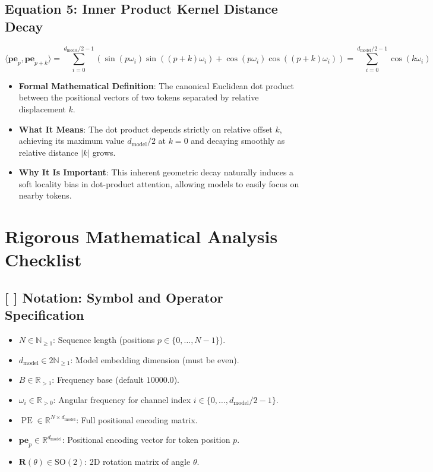 \documentclass[11pt,a4paper]{article}
\theoremstyle{definition}
\begin{document}
\subsection{\textbf{Equation 5: Inner Product Kernel Distance Decay}}
{\boldmath
\begin{equation}
\langle \mathbf{pe}_p, \mathbf{pe}_{p+k} \rangle = \sum_{i=0}^{d_{\text{model}}/2 - 1} \left( \sin(p\omega_i)\sin((p+k)\omega_i) + \cos(p\omega_i)\cos((p+k)\omega_i) \right) = \sum_{i=0}^{d_{\text{model}}/2 - 1} \cos(k \omega_i)
\end{equation}
}
\begin{itemize}
    \item \textbf{Formal Mathematical Definition}:
    The canonical Euclidean dot product between the positional vectors of two tokens separated by relative displacement $k$.
    \item \textbf{What It Means}:
    The dot product depends strictly on relative offset $k$, achieving its maximum value $d_{\text{model}}/2$ at $k=0$ and decaying smoothly as relative distance $|k|$ grows.
    \item \textbf{Why It Is Important}:
    This inherent geometric decay naturally induces a soft locality bias in dot-product attention, allowing models to easily focus on nearby tokens.
\end{itemize}

\section{Rigorous Mathematical Analysis Checklist}

\subsection{[ ] Notation: Symbol and Operator Specification}
\begin{itemize}
    \item $N \in \mathbb{N}_{\ge 1}$: Sequence length (positions $p \in \{0, \dots, N-1\}$).
    \item $d_{\text{model}} \in 2\mathbb{N}_{\ge 1}$: Model embedding dimension (must be even).
    \item $B \in \mathbb{R}_{> 1}$: Frequency base (default $10000.0$).
    \item $\omega_i \in \mathbb{R}_{> 0}$: Angular frequency for channel index $i \in \{0, \dots, d_{\text{model}}/2 - 1\}$.
    \item $\operatorname{PE} \in \mathbb{R}^{N \times d_{\text{model}}}$: Full positional encoding matrix.
    \item $\mathbf{pe}_p \in \mathbb{R}^{d_{\text{model}}}$: Positional encoding vector for token position $p$.
    \item $\mathbf{R}(\theta) \in \mathrm{SO}(2)$: 2D rotation matrix of angle $\theta$.
\end{itemize}
\end{document}
